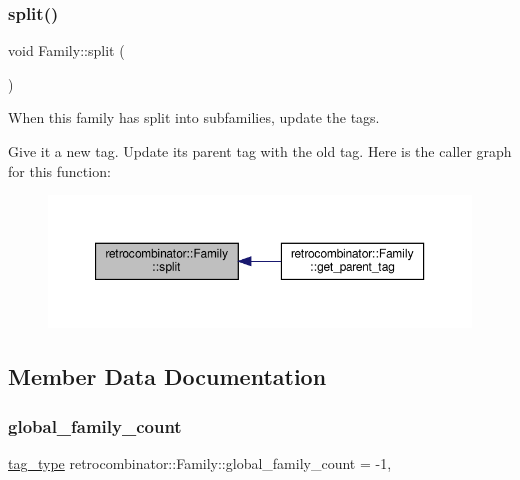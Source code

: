 \subsubsection{\texorpdfstring{split()}{split()}}
{\footnotesize\ttfamily void Family\+::split (\begin{DoxyParamCaption}{ }\end{DoxyParamCaption})}



When this family has split into subfamilies, update the tags. 

Give it a new tag. Update its parent tag with the old tag. Here is the caller graph for this function\+:
\nopagebreak
\begin{figure}[H]
\begin{center}
\leavevmode
\includegraphics[width=350pt]{classretrocombinator_1_1Family_a721e453eb40fa49bd38ae24df001f9a3_icgraph}
\end{center}
\end{figure}


\subsection{Member Data Documentation}
\mbox{\label{classretrocombinator_1_1Family_a957b56c44378b30bfeb0a8eebe9aa32d}} 
\subsubsection{\texorpdfstring{global\+\_\+family\+\_\+count}{global\_family\_count}}
{\footnotesize\ttfamily \hyperlink{constants_8h_afd7c6eb4293e8c4d12827609a9a34b9b}{tag\+\_\+type} retrocombinator\+::\+Family\+::global\+\_\+family\+\_\+count = -\/1\hspace{0.3cm}{\ttfamily [static]}, {\ttfamily [private]}}



